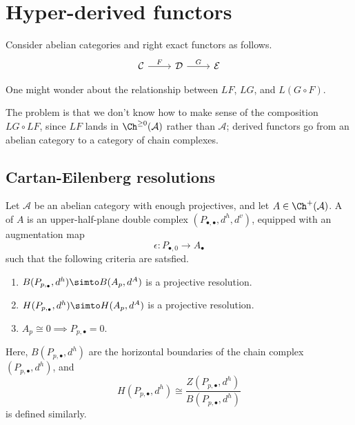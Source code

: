 \documentclass[main.tex]{subfiles}
\begin{document}
\section{Hyper-derived functors}
\label{sec:hyper_derived_functors}

Consider abelian categories and right exact functors as follows.
\begin{equation*}
  \begin{tikzcd}
    \mathcal{C}
    \arrow[r, "F"]
    & \mathcal{D}
    \arrow[r, "G"]
    & \mathcal{E}
  \end{tikzcd}
\end{equation*}

One might wonder about the relationship between $LF$, $LG$, and $L(G \circ F)$.

The problem is that we don't know how to make sense of the composition $LG \circ LF$, since $LF$ lands in $\Ch^{\geq 0}(\mathcal{A})$ rather than $\mathcal{A}$; derived functors go from an abelian category to a category of chain complexes.

\subsection{Cartan-Eilenberg resolutions}
\label{ssc:cartan_eilenberg_resolutions}

\begin{definition}
  \label{def:cartan_eilenberg_resolution}
  Let $\mathcal{A}$ be an abelian category with enough projectives, and let $A \in \Ch^{+}(\mathcal{A})$. A  of $A$ is an upper-half-plane double complex $(P_{\bullet,\bullet}, d^{h}, d^{v})$, equipped with an augmentation map
  \begin{equation*}
    \epsilon\colon P_{\bullet, 0} \to A_{\bullet}
  \end{equation*}
  such that the following criteria are satsfied.
  \begin{enumerate}
    \item $B(P_{p,_{\bullet}}, d^{h}) \simto B(A_{p}, d^{A})$ is a projective resolution.

    \item $H(P_{p,_{\bullet}}, d^{h}) \simto H(A_{p}, d^{A})$ is a projective resolution.

    \item $A_{p} \cong 0 \implies P_{p,\bullet} = 0$.
  \end{enumerate}
\end{definition}
Here, $B(P_{p,\bullet}, d^{h})$ are the horizontal boundaries of the chain complex $(P_{p,\bullet}, d^{h})$, and
\begin{equation*}
  H(P_{p,\bullet}, d^{h}) \cong \frac{Z(P_{p,\bullet}, d^{h})}{B(P_{p,\bullet}, d^{h})}
\end{equation*}
is defined similarly.
\end{document}
